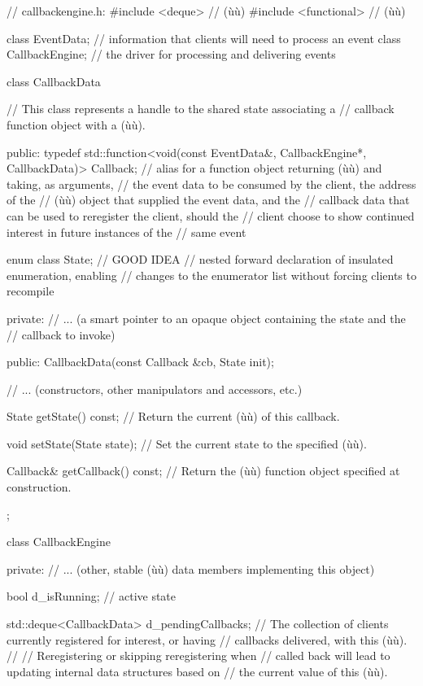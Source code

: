 \begin{emcppslisting}[emcppsbatch=e6]
// callbackengine.h:
#include <deque>          // (ù{}ù)
#include <functional>     // (ù{}ù)

class EventData;       // information that clients will need to process an event
class CallbackEngine;  // the driver for processing and delivering events

class CallbackData
{
    // This class represents a handle to the shared state associating a
    // callback function object with a (ù{}ù).

public:
    typedef std::function<void(const EventData&, CallbackEngine*,
        CallbackData)> Callback;
        // alias for a function object returning (ù{}ù) and taking, as arguments,
        // the event data to be consumed by the client, the address of the
        // (ù{}ù) object that supplied the event data, and the
        // callback data that can be used to reregister the client, should the
        // client choose to show continued interest in future instances of the
        // same event

    enum class State;  // GOOD IDEA
        // nested forward declaration of insulated enumeration, enabling
        // changes to the enumerator list without forcing clients to recompile

private:
    // ... (a smart pointer to an opaque object containing the state and the
    //      callback to invoke)

public:
    CallbackData(const Callback &cb, State init);

    // ... (constructors, other manipulators and accessors, etc.)

    State getState() const;
        // Return the current (ù{}ù) of this callback.

    void setState(State state);
        // Set the current state to the specified (ù{}ù).

    Callback& getCallback() const;
        // Return the (ù{}ù) function object specified at construction.
};

class CallbackEngine
{
private:
    // ... (other, stable (ù{}ù) data members implementing this object)

    bool d_isRunning;  // active state

    std::deque<CallbackData> d_pendingCallbacks;
        // The collection of clients currently registered for interest, or having
        // callbacks delivered, with this (ù{}ù).
        //
        // Reregistering or skipping reregistering when
        // called back will lead to updating internal data structures based on
        // the current value of this (ù{}ù).

}
\end{emcppslisting}
